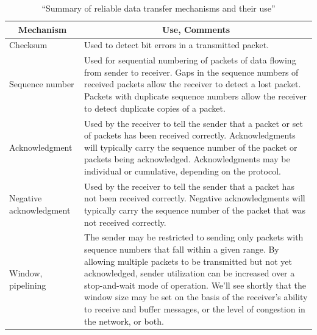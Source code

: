 {
\setlength{\tabcolsep}{16pt}

\begin{table}[h!]
    \centering
    \captionsetup{justification=centering}
    \begin{tabularx}{\textwidth}{lX}
        \toprule
        \multicolumn{1}{c}{\textbf{Mechanism}} & \multicolumn{1}{c}{\textbf{Use, Comments}} \\
        \midrule
        Checksum & Used to detect bit errors in a transmitted packet. \\ \midrule
        Sequence number & Used for sequential numbering of packets of data flowing from sender to receiver. Gaps in the sequence numbers of received packets allow the receiver to detect a lost packet. Packets with duplicate sequence numbers allow the receiver to detect duplicate copies of a packet. \\ \midrule
        Acknowledgment & Used by the receiver to tell the sender that a packet or set of packets has been received correctly. Acknowledgments will typically carry the sequence number of the packet or packets being acknowledged. Acknowledgments may be individual or cumulative, depending on the protocol. \\ \midrule
        Negative acknowledgment & Used by the receiver to tell the sender that a packet has not been received correctly. Negative acknowledgments will typically carry the sequence number of the packet that was not received correctly. \\ \midrule
        Window, pipelining & The sender may be restricted to sending only packets with sequence numbers that fall within a given range. By allowing multiple packets to be transmitted but not yet acknowledged, sender utilization can be increased over a stop-and-wait mode of operation. We’ll see shortly that the window size may be set on the basis of the receiver’s ability to receive and buffer messages, or the level of congestion in the network, or both. \\
        \bottomrule
    \end{tabularx}
    \caption{``Summary of reliable data transfer mechanisms and their use''\cite{Kurose2017}}
    \label{tab:TLDR}
\end{table}
}

